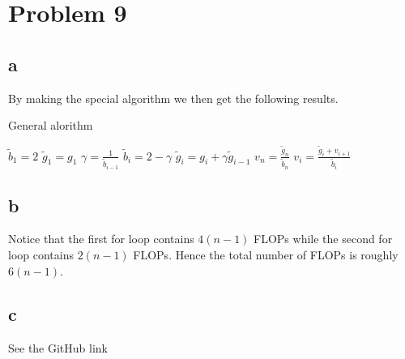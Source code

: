 \documentclass[english,notitlepage]{revtex4-1}  %
\begin{document}
\section*{Problem 9}
    \subsection*{a}
        \label{sec:9a}
        By making the special algorithm we then get the following results. 
        \begin{algorithm}[H]
            \caption{General alorithm}\label{algo:special}
            \begin{algorithmic}
                \State $\tilde{b}_1 = 2$
                \State $\tilde{g}_1 = g_1$
                    \State $\gamma = \frac{1}{\tilde{b}_{i - 1}}$
                    \State $\tilde{b}_i = 2 - \gamma$
                    \State $\tilde{g}_i = g_i + \gamma\tilde{g}_{i-1}$
                \EndFor
                \State $v_n = \frac{\tilde{g}_n}{\tilde{b}_n}$
                    \State $v_i = \frac{\tilde{g}_i + v_{i+1}}{\tilde{b}_i}$
                \EndFor
            \end{algorithmic}
        \end{algorithm}

    \subsection*{b}
        \label{sec:9b}
        Notice that the first for loop contains $4(n-1)$ FLOPs while the second for loop contains $2(n-1)$ FLOPs.
        Hence the total number of FLOPs is roughly $6(n-1)$.

    \subsection*{c}
        \label{sec:9c}
        See the GitHub link
\end{document}
